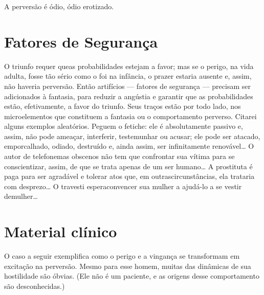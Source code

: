 A perversão é ódio, ódio erotizado.\idxperigofor[|)]


\section{Fatores de Segurança}

O triunfo requer que\idxfantafato[|(] as probabilidades estejam a favor; mas se o
perigo,\idxfeticarti{} na vida adulta, fosse tão sério como o foi na infância, o
prazer estaria ausente e, assim, não haveria perversão. Então
artifícios --- fatores de segurança --- precisam ser adicionados à
fantasia, para reduzir a angústia e garantir que as probabilidades
estão, efetivamente, a favor do triunfo. Seus traços estão por todo
lado, nos microelementos que constituem a fantasia ou o comportamento
perverso. Citarei alguns exemplos aleatórios. Peguem o fetiche: ele é
absolutamente passivo e, assim, não pode ameaçar, interferir,
testemunhar ou acusar; ele pode ser atacado, emporcalhado, odiado,
destruído e, ainda assim, ser infinitamente renovável\ldots{} O autor de
telefonemas\idxtelef{} obscenos não tem que confrontar sua vítima para se
conscientizar, assim, de que se trata apenas de um ser humano\ldots{} A
prostituta é paga para ser agradável e tolerar atos que, em outras\idxperigo[|)]
circunstâncias, ela trataria com desprezo\ldots{} O travesti espera\idxpervexpos[|)]
convencer sua mulher\idxtravempape{} a ajudá-lo a se vestir de\idxfantafato[|)] mulher\ldots{}

\section{Material clínico}

O caso a seguir exemplifica como o perigo e a vingança se
transformam em excitação na perversão. Mesmo para esse homem, muitas
das dinâmicas de sua hostilidade são óbvias. (Ele não é um paciente, e
as origens desse comportamento são desconhecidas.)

